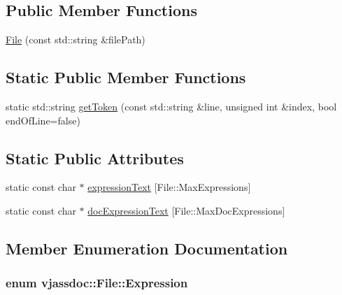 \subsection*{Public Member Functions}
\begin{CompactItemize}
\item 
\hyperlink{classvjassdoc_1_1File_d35f0f273a4e7ecc96e4315edb842151}{File} (const std::string \&filePath)
\end{CompactItemize}
\subsection*{Static Public Member Functions}
\begin{CompactItemize}
\item 
static std::string \hyperlink{classvjassdoc_1_1File_424079db72abbc4c6812691748c10362}{getToken} (const std::string \&line, unsigned int \&index, bool endOfLine=false)
\end{CompactItemize}
\subsection*{Static Public Attributes}
\begin{CompactItemize}
\item 
static const char $\ast$ \hyperlink{classvjassdoc_1_1File_bcc699454548ae47f02ca6cdf6b333ab}{expressionText} \mbox{[}File::MaxExpressions\mbox{]}
\item 
static const char $\ast$ \hyperlink{classvjassdoc_1_1File_399e6e8a31347b0f354727874a825c34}{docExpressionText} \mbox{[}File::MaxDocExpressions\mbox{]}
\end{CompactItemize}


\subsection{Member Enumeration Documentation}
\hypertarget{classvjassdoc_1_1File_78479b8cb631d0db80ba984da1781265}{
\subsubsection{\setlength{\rightskip}{0pt plus 5cm}enum {\bf vjassdoc::File::Expression}}}
\label{classvjassdoc_1_1File_78479b8cb631d0db80ba984da1781265}


